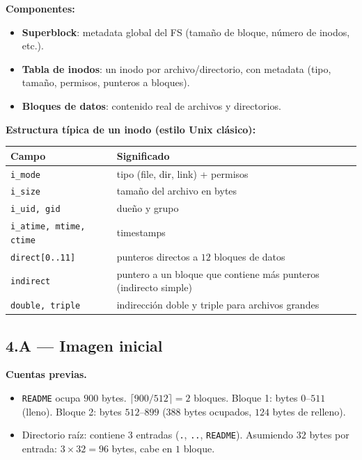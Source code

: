 \documentclass[11pt,a4paper]{article}
\begin{document}
\textbf{Componentes:}

\begin{itemize}[leftmargin=*,nosep]
    \item \textbf{Superblock}: metadata global del FS (tamaño de
        bloque, número de inodos, etc.).
    \item \textbf{Tabla de inodos}: un inodo por archivo/directorio,
        con metadata (tipo, tamaño, permisos, punteros a bloques).
    \item \textbf{Bloques de datos}: contenido real de archivos y
        directorios.
\end{itemize}

\textbf{Estructura típica de un inodo (estilo Unix clásico):}

\begin{center}
\small
\begin{tabular}{@{}lp{8.5cm}@{}}
\toprule
Campo                & Significado \\
\midrule
\texttt{i\_mode}     & tipo (file, dir, link) + permisos \\
\texttt{i\_size}     & tamaño del archivo en bytes \\
\texttt{i\_uid, gid} & dueño y grupo \\
\texttt{i\_atime, mtime, ctime} & timestamps \\
\texttt{direct[0..11]} & punteros directos a $12$ bloques de datos \\
\texttt{indirect}    & puntero a un bloque que contiene más punteros (indirecto simple) \\
\texttt{double, triple} & indirección doble y triple para archivos grandes \\
\bottomrule
\end{tabular}
\end{center}

\subsection*{4.A --- Imagen inicial}

\textbf{Cuentas previas.}
\begin{itemize}[leftmargin=*,nosep]
    \item \texttt{README} ocupa $900$ bytes.
        $\lceil 900 / 512 \rceil = 2$ bloques.
        Bloque 1: bytes $0$--$511$ (lleno).
        Bloque 2: bytes $512$--$899$ ($388$ bytes ocupados, $124$
        bytes de relleno).
    \item Directorio raíz: contiene $3$ entradas (\texttt{.},
        \texttt{..}, \texttt{README}). Asumiendo $32$ bytes por
        entrada: $3 \times 32 = 96$ bytes, cabe en $1$ bloque.
\end{itemize}
\end{document}
